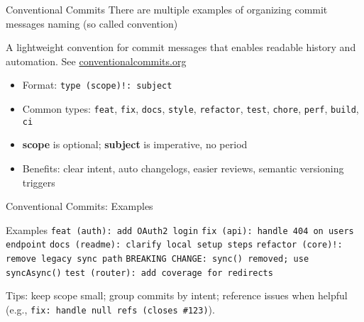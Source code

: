 \documentclass{beamer}
\begin{document}
\begin{frame}{Conventional Commits}
  There are multiple examples of organizing commit messages naming (so called convention)

  \footnotesize
  A lightweight convention for commit messages that enables readable history and automation. See \href{https://www.conventionalcommits.org/}{conventionalcommits.org}
  \begin{itemize}
    \item Format: \texttt{type (scope)!: subject}
    \item Common types: \texttt{feat}, \texttt{fix}, \texttt{docs}, \texttt{style},
      \texttt{refactor}, \texttt{test}, \texttt{chore}, \texttt{perf}, \texttt{build}, \texttt{ci}
    \item \textbf{scope} is optional; \textbf{subject} is imperative, no period
    \item Benefits: clear intent, auto changelogs, easier reviews, semantic versioning triggers
  \end{itemize}
\end{frame}

\begin{frame}{Conventional Commits: Examples}
  \begin{block}{Examples}
    \texttt{feat (auth): add OAuth2 login}\newline
    \texttt{fix (api): handle 404 on users endpoint}\newline
    \texttt{docs (readme): clarify local setup steps}\newline
    \texttt{refactor (core)!: remove legacy sync path}\newline
    \texttt{BREAKING CHANGE\@: sync\@() removed; use syncAsync\@()}\newline
    \texttt{test (router): add coverage for redirects}
  \end{block}
  \vspace{0.4em}
  Tips: keep scope small; group commits by intent; reference issues when helpful (e.g., \texttt{fix: handle null refs (closes \#123)}).
\end{frame}
\end{document}
